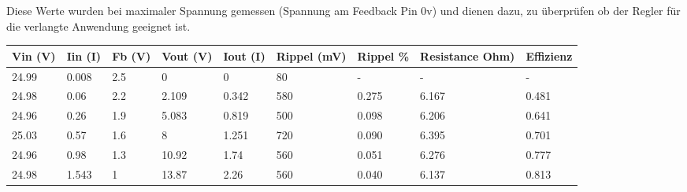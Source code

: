 Diese Werte wurden bei maximaler Spannung gemessen (Spannung am Feedback Pin 0v) und dienen dazu, zu überprüfen ob der Regler für die verlangte Anwendung geeignet ist.
\newpage
\begin{table}[h]
\centering

\label{fig::Res6}
\begin{tabular}{|l|l|l|l|l|l|l|l|l|}
\hline
\multicolumn{1}{|c|}{Vin (V)} & \multicolumn{1}{c|}{Iin (I)} & \multicolumn{1}{c|}{Fb (V)} & \multicolumn{1}{c|}{Vout (V)} & \multicolumn{1}{c|}{Iout (I)} & \multicolumn{1}{c|}{Rippel (mV)} & \multicolumn{1}{c|}{Rippel \%} & \multicolumn{1}{c|}{Resistance Ohm)} & \multicolumn{1}{c|}{Effizienz} \\ \hline
24.99                         & 0.008                        & 2.5                         & 0                             & 0                             & 80                               & -                              & -                                    & -                              \\ \hline
24.98                         & 0.06                         & 2.2                         & 2.109                         & 0.342                         & 580                              & 0.275                          & 6.167                                & 0.481                          \\ \hline
24.96                         & 0.26                         & 1.9                         & 5.083                         & 0.819                         & 500                              & 0.098                          & 6.206                                & 0.641                          \\ \hline
25.03                         & 0.57                         & 1.6                         & 8                             & 1.251                         & 720                              & 0.090                          & 6.395                                & 0.701                          \\ \hline
24.96                         & 0.98                         & 1.3                         & 10.92                         & 1.74                          & 560                              & 0.051                          & 6.276                                & 0.777                          \\ \hline
24.98                         & 1.543                        & 1                           & 13.87                         & 2.26                          & 560                              & 0.040                          & 6.137                                & 0.813                          \\ \hline

\end{tabular}
\end{table}
